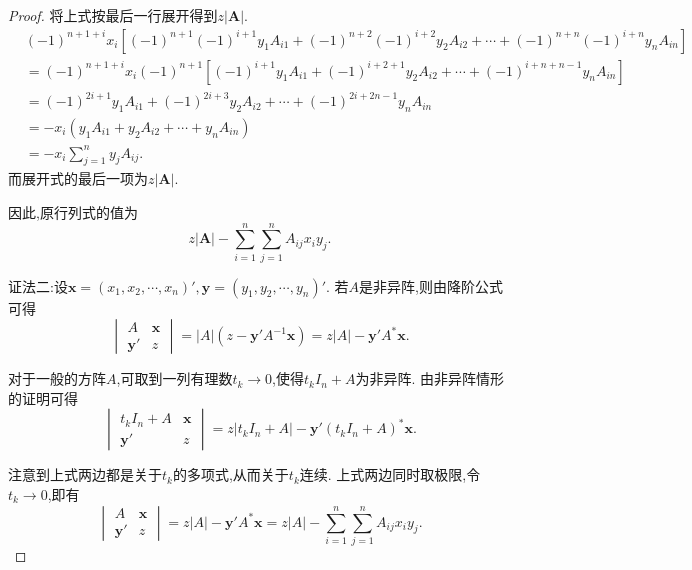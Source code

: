 \documentclass[../../main.tex]{subfiles}
\begin{document}
\begin{proof}
将上式按最后一行展开得到$z\left|\boldsymbol{A}\right|$.
\begin{equation}
\begin{split}
&\left( -1 \right) ^{n+1+i}x_i\left[ \left( -1 \right) ^{n+1}\left( -1 \right) ^{i+1}y_1A_{i1}+\left( -1 \right) ^{n+2}\left( -1 \right) ^{i+2}y_2A_{i2}+\cdots +\left( -1 \right) ^{n+n}\left( -1 \right) ^{i+n}y_nA_{in} \right] 
\\
&=\left( -1 \right) ^{n+1+i}x_i\left( -1 \right) ^{n+1}\left[ \left( -1 \right) ^{i+1}y_1A_{i1}+\left( -1 \right) ^{i+2+1}y_2A_{i2}+\cdots +\left( -1 \right) ^{i+n+n-1}y_nA_{in} \right] 
\\
&=\left( -1 \right) ^{2i+1}y_1A_{i1}+\left( -1 \right) ^{2i+3}y_2A_{i2}+\cdots +\left( -1 \right) ^{2i+2n-1}y_nA_{in}
\\
&=-x_i\left( y_1A_{i1}+y_2A_{i2}+\cdots +y_nA_{in} \right) 
\\
&=-x_i\sum_{j=1}^n{y_jA_{ij}.}
\end{split}
\nonumber
\end{equation}
而展开式的最后一项为$z\left|\boldsymbol{A}\right|$.

因此,原行列式的值为
\begin{equation}
z|\boldsymbol{A}|-\sum_{i=1}^n{\sum_{j=1}^n{A_{ij}x_iy_j.}}
\nonumber
\end{equation}

{\color{blue}证法二:}设\(\boldsymbol{x}=(x_1,x_2,\cdots,x_n)',\boldsymbol{y}=(y_1,y_2,\cdots,y_n)'\). 若\(A\)是非异阵,则由降阶公式可得
\[
\begin{vmatrix}
A & \boldsymbol{x}\\
\boldsymbol{y}' & z
\end{vmatrix}=|A|(z - \boldsymbol{y}'A^{-1}\boldsymbol{x})=z|A| - \boldsymbol{y}'A^*\boldsymbol{x}.
\]

对于一般的方阵\(A\),可取到一列有理数\(t_k\rightarrow0\),使得\(t_kI_n + A\)为非异阵. 由非异阵情形的证明可得
\[
\begin{vmatrix}
t_kI_n + A & \boldsymbol{x}\\
\boldsymbol{y}' & z
\end{vmatrix}=z|t_kI_n + A| - \boldsymbol{y}'(t_kI_n + A)^*\boldsymbol{x}.
\]

注意到上式两边都是关于\(t_k\)的多项式,从而关于\(t_k\)连续. 上式两边同时取极限,令\(t_k\rightarrow0\),即有
\[
\begin{vmatrix}
A & \boldsymbol{x}\\
\boldsymbol{y}' & z
\end{vmatrix}=z|A| - \boldsymbol{y}'A^*\boldsymbol{x}=z|A|-\sum_{i = 1}^{n}\sum_{j = 1}^{n}A_{ij}x_iy_j.
\]
\end{proof}
\end{document}
